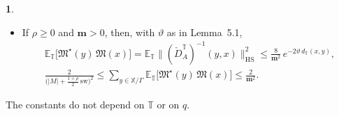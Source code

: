 \documentclass[11pt]{amsart}
\newcommand{\namedhead}{}
\theoremstyle{definition}
\newtheorem*{namedinner}{\namedhead}
\newenvironment{named}[1]{\renewcommand{\namedhead}{#1}\begin{namedinner}}{\end{namedinner}}
\begin{document}
\begin{named}{Proposition 5.4}
\begin{itemize}
\begin{equation*}
Z_{\mathbb T}\bigl[\mathfrak M^\star(y)\,\mathfrak M(x)\bigr]=\int_{\mathrm{Conf}(\Gamma)}\mathrm d(A,z)\,e^{-\frac12\|F\|^2}\,\bigl\|\operatorname{adj}\bigl(\check D^{\mathbb T}_A\bigr)(y,x)\bigr\|_{\mathrm{HS}}^2\ge0.
\end{equation*}
\item[(c)] If $\rho\ge0$ and $\mathbf m>0$, then, with $\vartheta$ as in Lemma~5.1,
\begin{gather*}
\mathbb E_{\mathbb T}\bigl[\mathfrak M^\star(y)\,\mathfrak M(x)\bigr]=\mathbb E_{\mathbb T}\bigl\|(\check D^{\mathbb T}_A)^{-1}(y,x)\bigr\|_{\mathrm{HS}}^2\le\frac{8}{\mathbf m^2}\,e^{-2\vartheta\,d_{\mathbb T}(x,y)},\\
\frac{2}{\bigl(|M|+\frac{1+\rho}{2}\,\mathrm{sw}\bigr)^2}\le\sum_{y\in\mathbb X/\Gamma}\mathbb E_{\mathbb T}\bigl[\mathfrak M^\star(y)\,\mathfrak M(x)\bigr]\le\frac{2}{\mathbf m^2}.
\end{gather*}
\end{itemize}
The constants do not depend on $\mathbb T$ or on $q$.
\end{named}
\end{document}
